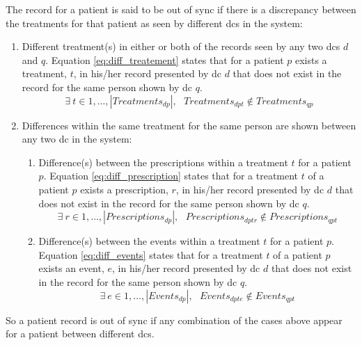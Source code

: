 The record for a patient is said to be out of sync if there is a discrepancy between the treatments for that patient as seen by different \glspl{dc} in the system:
\begin{enumerate}
	\item Different treatment(s) in either or both of the records seen by any two \glspl{dc} $d$ and $q$. Equation \ref{eq:diff_treatement} states that for a patient $p$ exists a treatment, $t$, in his/her record presented by \gls{dc} $d$ that does not exist in the record for the same person shown by \gls{dc} $q$.
		\begin{equation} \label{eq:diff_treatement}
			\exists ~ t \in {1,\dots, |Treatments_{dp}|}, \text{  } Treatments_{dpt} \not\in Treatments_{qp}
		\end{equation}
	\item Differences within the same treatment for the same person are shown between any two \gls{dc} in the system:
		\begin{enumerate}
			\item Difference(s) between the prescriptions within a treatment $t$ for a patient $p$. Equation \ref{eq:diff_prescription} states that for a treatment $t$ of a patient $p$ exists a prescription, $r$, in his/her record presented by \gls{dc} $d$ that does not exist in the record for the same person shown by \gls{dc} $q$.
				\begin{equation} \label{eq:diff_prescription}
					\exists ~ r \in {1,\dots, |Prescriptions_{dp}|}, \text{  } Prescriptions_{dptr} \not\in Prescriptions_{qpt}
				\end{equation}
			\item Difference(s) between the events within a treatment $t$ for a patient $p$. Equation \ref{eq:diff_events} states that for a treatment $t$ of a patient $p$ exists an event, $e$, in his/her record presented by \gls{dc} $d$ that does not exist in the record for the same person shown by \gls{dc} $q$.
				\begin{equation} \label{eq:diff_events}
					\exists ~ e \in {1,\dots, |Events_{dp}|}, \text{  } Events_{dpte} \not\in Events_{qpt}
				\end{equation}
		\end{enumerate}
\end{enumerate}

So a patient record is out of sync if any combination of the cases above appear for a patient between different \glspl{dc}.
